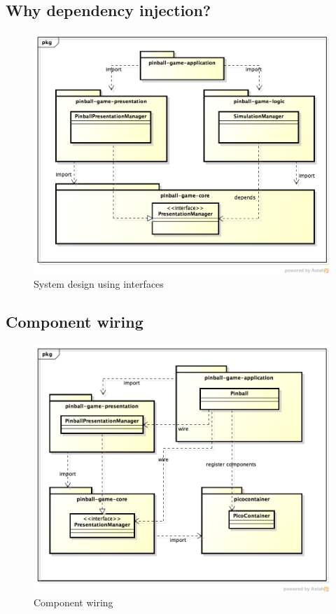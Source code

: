 \documentclass[fontsize=12pt,
               paper=a4,
               twoside=false,
               parskip=half,
               ]{scrartcl}
\begin{document}
\subsection{Why dependency injection?}

\begin{figure}[h!]
	\centering
	\includegraphics[width=15.5cm]{./img/dependency-injection1.png}
	\caption[System design]{System design using interfaces}
	\label{fig:dependency_injection1}
\end{figure}

\subsection{Component wiring}

\begin{figure}[h!]
	\centering
	\includegraphics[width=15.5cm]{./img/dependency-injection2.png}
	\caption[Component wiring]{Component wiring}
	\label{fig:dependency_injection2}
\end{figure}
\end{document}
